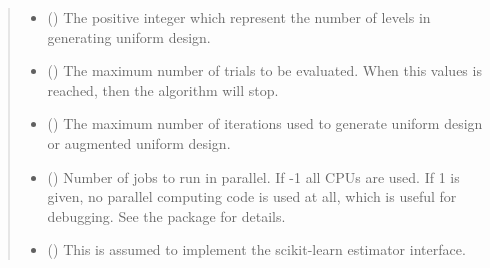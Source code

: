 \documentclass[letterpaper,10pt,english]{sphinxmanual}
\begin{document}
\begin{fulllineitems}
\begin{quote}
\begin{description}
\begin{itemize}
\item {} 
 (\sphinxstyleliteralemphasis{\sphinxupquote{, }}\sphinxstyleliteralemphasis{\sphinxupquote{, }}) \textendash{} The positive integer which represent the number of levels in generating uniform design.

\item {} 
 (\sphinxstyleliteralemphasis{\sphinxupquote{, }}\sphinxstyleliteralemphasis{\sphinxupquote{, }}) \textendash{} The maximum number of trials to be evaluated. When this values is reached, 
then the algorithm will stop.

\item {} 
 (\sphinxstyleliteralemphasis{\sphinxupquote{, }}\sphinxstyleliteralemphasis{\sphinxupquote{, }}) \textendash{} The maximum number of iterations used to generate uniform design or augmented uniform design.

\item {} 
 (\sphinxstyleliteralemphasis{\sphinxupquote{, }}\sphinxstyleliteralemphasis{\sphinxupquote{, }}\sphinxstyleliteralemphasis{\sphinxupquote{, }}) \textendash{} Number of jobs to run in parallel.
If -1 all CPUs are used. If 1 is given, no parallel computing code
is used at all, which is useful for debugging. See the package  for details.

\item {} 
 () \textendash{} This is assumed to implement the scikit-learn estimator interface.


\end{itemize}
\end{description}
\end{quote}
\end{fulllineitems}
\end{document}
